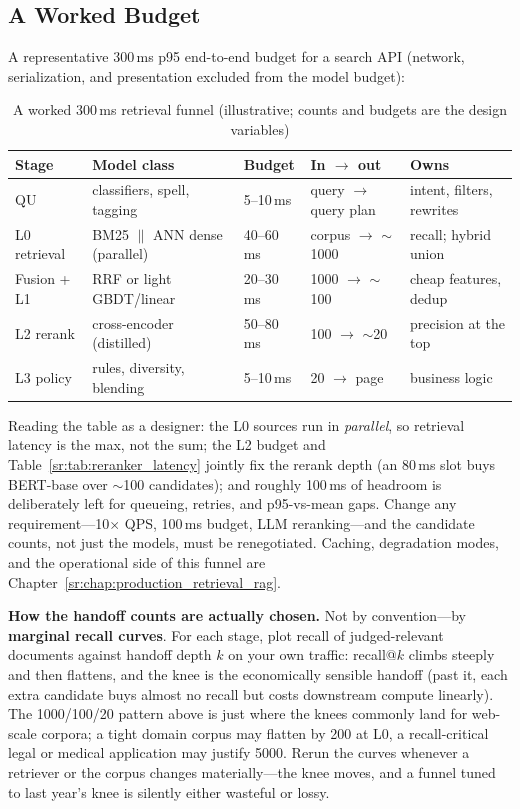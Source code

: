 \subsection{A Worked Budget}
\label{sr:subsec:funnel_budget}

A representative 300\,ms p95 end-to-end budget for a search API (network, serialization, and presentation excluded from the model budget):

\begin{table}[H]
\centering
\small
\caption{A worked 300\,ms retrieval funnel (illustrative; counts and budgets are the design variables)}
\label{sr:tab:funnel_budget}
\begin{tabularx}{\textwidth}{lXXXX}
\toprule
\textbf{Stage} & \textbf{Model class} & \textbf{Budget} & \textbf{In $\to$ out} & \textbf{Owns} \\
\midrule
QU & classifiers, spell, tagging & 5--10\,ms & query $\to$ query plan & intent, filters, rewrites \\
L0 retrieval & BM25 $\parallel$ ANN dense (parallel) & 40--60\,ms & corpus $\to$ $\sim$1000 & recall; hybrid union \\
Fusion + L1 & RRF or light GBDT/linear & 20--30\,ms & 1000 $\to$ $\sim$100 & cheap features, dedup \\
L2 rerank & cross-encoder (distilled) & 50--80\,ms & 100 $\to$ $\sim$20 & precision at the top \\
L3 policy & rules, diversity, blending & 5--10\,ms & 20 $\to$ page & business logic \\
\bottomrule
\end{tabularx}
\end{table}

Reading the table as a designer: the L0 sources run in \textit{parallel}, so retrieval latency is the max, not the sum; the L2 budget and Table~\ref{sr:tab:reranker_latency} jointly fix the rerank depth (an 80\,ms slot buys BERT-base over $\sim$100 candidates); and roughly 100\,ms of headroom is deliberately left for queueing, retries, and p95-vs-mean gaps. Change any requirement---10$\times$ QPS, 100\,ms budget, LLM reranking---and the candidate counts, not just the models, must be renegotiated. Caching, degradation modes, and the operational side of this funnel are Chapter~\ref{sr:chap:production_retrieval_rag}.

\textbf{How the handoff counts are actually chosen.} Not by convention---by \textbf{marginal recall curves}. For each stage, plot recall of judged-relevant documents against handoff depth $k$ on your own traffic: recall@$k$ climbs steeply and then flattens, and the knee is the economically sensible handoff (past it, each extra candidate buys almost no recall but costs downstream compute linearly). The 1000/100/20 pattern above is just where the knees commonly land for web-scale corpora; a tight domain corpus may flatten by 200 at L0, a recall-critical legal or medical application may justify 5000. Rerun the curves whenever a retriever or the corpus changes materially---the knee moves, and a funnel tuned to last year's knee is silently either wasteful or lossy.

